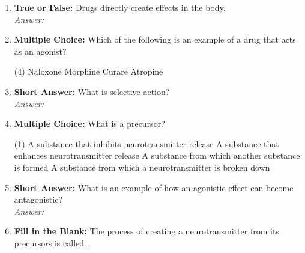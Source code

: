 \begin{enumerate}[label=\textbf{Q3.1.\arabic*}]
    \item \textbf{True or False:} Drugs directly create effects in the body. \\
        \textit{Answer:} %

    \item \textbf{Multiple Choice:} Which of the following is an example of a drug that acts as an agonist?
        \begin{tasks}[label=\textcolor{\documentTheme}{(\Alph*)}, item-format=\color{\documentTheme}, label-width=1.5em, item-indent=1.7em](4)
            \task Naloxone
            \task Morphine
            \task Curare
            \task Atropine
        \end{tasks}

    \item \textbf{Short Answer:} What is selective action? \\
        \textit{Answer:} \\%

    \item \textbf{Multiple Choice:} What is a precursor?
        \begin{tasks}[label=\textcolor{\documentTheme}{(\Alph*)}, item-format=\color{\documentTheme}, label-width=1.5em, item-indent=1.7em](1)
            \task A substance that inhibits neurotransmitter release
            \task A substance that enhances neurotransmitter release
            \task A substance from which another substance is formed
            \task A substance from which a neurotransmitter is broken down
        \end{tasks}

    \item \textbf{Short Answer:} What is an example of how an agonistic effect can become antagonistic? \\
        \textit{Answer:} \\%

    \item \textbf{Fill in the Blank:} The process of creating a neurotransmitter from its precursors is called \underline{\hspace{3cm}}.


\end{enumerate}

